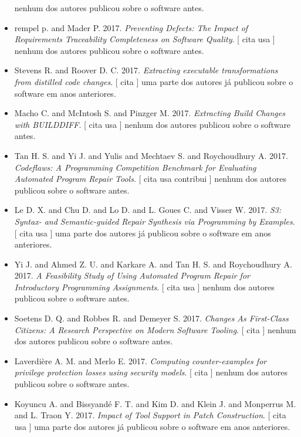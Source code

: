 \begin{itemize}
nenhum dos autores publicou sobre o software antes.
\item rempel p. and Mader P.
      2017.
        \textit{ Preventing Defects: The Impact of Requirements Traceability Completeness on Software Quality}.
      [
          cita
          usa
      ]
nenhum dos autores publicou sobre o software antes.
\item Stevens R. and Roover D. C.
      2017.
        \textit{ Extracting executable transformations from distilled code changes}.
      [
          cita
      ]
uma parte dos autores já publicou sobre o software em anos anteriores.
\item Macho C. and McIntosh S. and Pinzger M.
      2017.
        \textit{ Extracting Build Changes with BUILDDIFF}.
      [
          cita
          usa
      ]
nenhum dos autores publicou sobre o software antes.
\item Tan H. S. and Yi J. and Yulis and Mechtaev S. and Roychoudhury A.
      2017.
        \textit{ Codeflaws: A Programming Competition Benchmark for Evaluating Automated Program Repair Tools}.
      [
          cita
          usa
          contribui
      ]
nenhum dos autores publicou sobre o software antes.
\item Le D. X. and Chu D. and Lo D. and L. Goues C. and Visser W.
      2017.
        \textit{ S3: Syntax- and Semantic-guided Repair Synthesis via Programming by Examples}.
      [
          cita
          usa
      ]
uma parte dos autores já publicou sobre o software em anos anteriores.
\item Yi J. and Ahmed Z. U. and Karkare A. and Tan H. S. and Roychoudhury A.
      2017.
        \textit{ A Feasibility Study of Using Automated Program Repair for Introductory Programming Assignments}.
      [
          cita
          usa
      ]
nenhum dos autores publicou sobre o software antes.
\item Soetens D. Q. and Robbes R. and Demeyer S.
      2017.
        \textit{ Changes As First-Class Citizens: A Research Perspective on Modern Software Tooling}.
      [
          cita
      ]
nenhum dos autores publicou sobre o software antes.
\item Laverdière A. M. and Merlo E.
      2017.
        \textit{ Computing counter-examples for privilege protection losses using security models}.
      [
          cita
      ]
nenhum dos autores publicou sobre o software antes.
\item Koyuncu A. and Bissyand{\'e} F. T. and Kim D. and Klein J. and Monperrus M. and L. Traon Y.
      2017.
        \textit{ Impact of Tool Support in Patch Construction}.
      [
          cita
          usa
      ]
uma parte dos autores já publicou sobre o software em anos anteriores.
\end{itemize}
